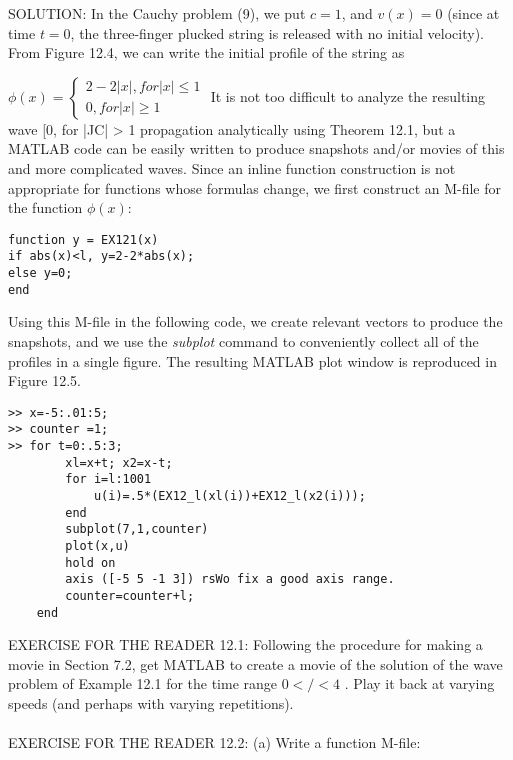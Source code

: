 \documentclass[../main.tex]{subfiles}
\begin{document}
SOLUTION: In the Cauchy problem (9), we put $c = 1$, and $v(x) = 0$ (since at
time $t = 0$, the three-finger plucked string is released with no initial velocity).
From Figure 12.4, we can write the initial profile of the string as

$\phi(x)=
\begin{cases} 2-2\vert x\vert,  for \vert x\vert \leqslant 1\\
0, for  \vert x\vert\geqslant 1
\end{cases}$
It is not too difficult to analyze the resulting wave
[0, for |JC| > 1
propagation analytically using Theorem 12.1, but a MATLAB code can be easily
written to produce snapshots and/or movies of this and more complicated waves.
Since an inline function construction is not appropriate for functions whose
formulas change, we first construct an M-file for the function $\phi(x):$
\newpage
\begin{verbatim}
function y = EX121(x)
if abs(x)<l, y=2-2*abs(x);
else y=0;
end
\end{verbatim}
Using this M-file in the following code, we create relevant vectors to produce the
snapshots, and we use the \textit{subplot} command to conveniently collect all of the
profiles in a single figure. The resulting MATLAB plot window is reproduced in
Figure 12.5. 

\begin{lstlisting}
>> x=-5:.01:5;
>> counter =1;
>> for t=0:.5:3;
		xl=x+t; x2=x-t;
		for i=l:1001
			u(i)=.5*(EX12_l(xl(i))+EX12_l(x2(i)));
		end
		subplot(7,1,counter)
		plot(x,u)
		hold on
		axis ([-5 5 -1 3]) rsWo fix a good axis range.
		counter=counter+l;
	end 
\end{lstlisting}

EXERCISE FOR THE READER 12.1: Following the procedure for making a
movie in Section 7.2, get MATLAB to create a movie of the solution of the wave
problem of Example 12.1 for the time range $0</<4$ . Play it back at varying
speeds (and perhaps with varying repetitions).\\
\\
EXERCISE FOR THE READER 12.2: (a) Write a function M-file:
\end{document}
